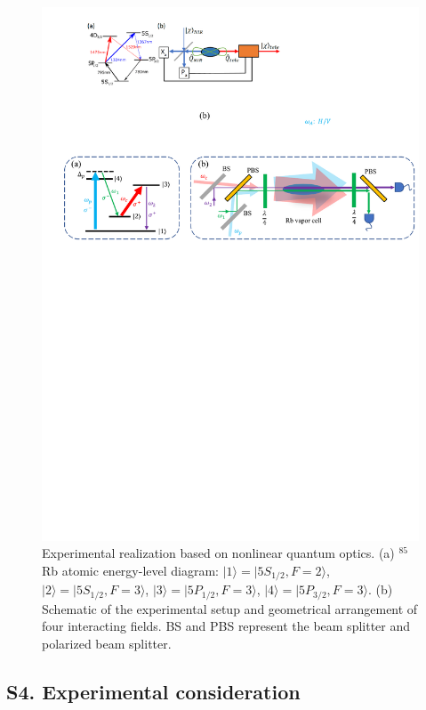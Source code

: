 \documentclass[twocolumn,prl,floatfix,citeautoscript,nofootinbib,superscriptaddress]{revtex4}
\begin{document}
\begin{widetext}
\begin{figure}[t]
\includegraphics[width=0.8\linewidth]{FigS1.pdf}
\caption{Experimental realization based on nonlinear quantum optics. (a) $%
^{85}$Rb atomic energy-level diagram: $|1\rangle =|5S_{1/2},F=2\rangle $, $%
|2\rangle =|5S_{1/2},F=3\rangle $, $|3\rangle =|5P_{1/2},F=3\rangle $, $%
|4\rangle =|5P_{3/2},F=3\rangle $. (b) Schematic of the experimental setup
and geometrical arrangement of four interacting fields. BS and PBS represent
the beam splitter and polarized beam splitter.}
\label{fig:S1}
\end{figure}

\subsection{S4. Experimental consideration}


\end{widetext}
\end{document}
